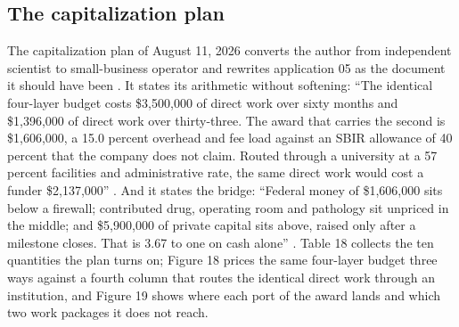 \subsection{The capitalization plan}

The capitalization plan of August 11, 2026 converts the author from independent
scientist to small-business operator and rewrites application 05 as the document
it should have been \cite{capplan2026}. It states its arithmetic without
softening: ``The identical four-layer budget costs \$3,500,000 of direct work
over sixty months and \$1,396,000 of direct work over thirty-three. The award
that carries the second is \$1,606,000, a 15.0 percent overhead and fee load
against an SBIR allowance of 40 percent that the company does not claim. Routed
through a university at a 57 percent facilities and administrative rate, the
same direct work would cost a funder \$2,137,000'' \cite{capplan2026}. And it
states the bridge: ``Federal money of \$1,606,000 sits below a firewall;
contributed drug, operating room and pathology sit unpriced in the middle; and
\$5,900,000 of private capital sits above, raised only after a milestone closes.
That is 3.67 to one on cash alone'' \cite{capplan2026, kratsiosvought2026fy2028priorities}.
Table 18 collects the ten quantities the plan turns on; Figure 18 prices the
same four-layer budget three ways against a fourth column that routes the
identical direct work through an institution, and Figure 19 shows where each
port of the award lands and which two work packages it does not reach.

